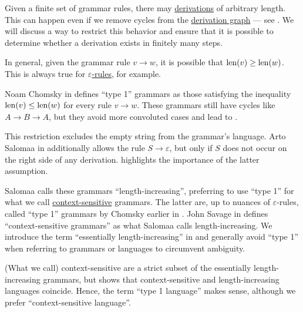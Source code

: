 \begin{remark}\label{rem:length_increasing_grammar}
  Given a finite set of grammar rules, there may \hyperref[def:formal_grammar/derivation]{derivations} of arbitrary length. This can happen even if we remove cycles from the \hyperref[def:formal_grammar/graph]{derivation graph} --- see . We will discuss a way to restrict this behavior and ensure that it is possible to determine whether a derivation exists in finitely many steps.

  In general, given the grammar rule \( v \to w \), it is possible that \( \operatorname{len}(v) \geq \operatorname{len}(w) \). This is always true for \hyperref[def:epsilon_free_grammar]{\( \varepsilon \)-rules}, for example.

  Noam Chomsky in \cite[361]{MathPsychology1963Vol2} defines \enquote{type 1} grammars as those satisfying the inequality \( \operatorname{len}(v) \leq \operatorname{len}(w) \) for every rule \( v \to w \). These grammars still have cycles like \( A \to B \to A \), but they avoid more convoluted cases and lead to .

  This restriction excludes the empty string from the grammar's language. Arto Salomaa in \cite[15]{Salomaa1987} additionally allows the rule \( S \to \varepsilon \), but only if \( S \) does not occur on the right side of any derivation.  highlights the importance of the latter assumption.

  Salomaa calls these grammars \enquote{length-increasing}, preferring to use \enquote{type 1} for what we call \hyperref[def:chomsky_hierarchy/context_sensitive]{context-sensitive} grammars. The latter are, up to nuances of \( \varepsilon \)-rules, called \enquote{type 1} grammars by Chomsky earlier in \cite[142]{Chomsky1959}. John Savage in \cite[def. 4.9.2]{Savage1998} defines \enquote{context-sensitive grammars} as what Salomaa calls length-increasing. We introduce the term \enquote{essentially length-increasing} in  and generally avoid \enquote{type 1} when referring to grammars or languages to circumvent ambiguity.

  (What we call) context-sensitive  are a strict subset of the essentially length-increasing grammars, but  shows that context-sensitive  and length-increasing languages coincide. Hence, the term \enquote{type 1 language} makes sense, although we prefer \enquote{context-sensitive language}.
\end{remark}

